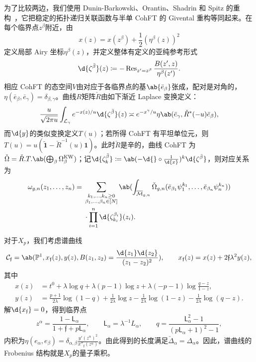 \documentclass{amsart}
\theoremstyle{definition}
\theoremstyle{remark}
\theoremstyle{plain}
\theoremstyle{definition}
\theoremstyle{remark}
\renewcommand{\P}{\mathbb{P}}
\newcommand{\Mbar}{\overline{\mathcal{M}}}
\newcommand{\mc}[1]{\mathcal{#1}}
\newcommand{\mf}[1]{\mathfrak{#1}}
\newcommand{\mr}[1]{\mathrm{#1}}
\newcommand{\on}[1]{\operatorname{#1}}
\newcommand{\ms}[1]{\mathsf{#1}}
\newcommand{\wt}[1]{\widetilde{#1}}
\newcommand{\1}{\mathbf{1}}
\newcommand{\2}{\mathbf{2}}
\newcommand{\3}{\mathbf{3}}
\begin{document}
为了比较两边，我们使用 Dunin-Barkowski、Orantin、Shadrin 和 Spitz 的重构~\cite{DOSS2014}，它把稳定的拓扑递归关联函数与半单 CohFT 的 Givental 重构等同起来。在每个临界点\(z^{\beta}\)附近，由
\[ x(z) = x(z^{\beta}) + \frac{1}{2}(\eta^{\beta}(z))^2 \]
定义局部 Airy 坐标\(\eta^{\beta}(z)\)，并定义整体有定义的亚纯参考形式
\[ \d{\zeta^{\bar{\beta}}}(z) \coloneqq -\on{Res}_{z'=z^{\beta}}\frac{B(z',z)}{\eta^{\beta}(z')}. \]
相应 CohFT 的态空间\(V\)由对应于各临界点的基\(\ab\{\bar{e}_{\beta}\}\)张成，配对是对角的，\(\eta(\bar{e}_{\beta},\bar{e}_{\gamma}) = \delta_{\beta,\gamma}\)。曲线\(R\)矩阵\(\check{R}\)由如下渐近 Laplace 变换定义：
\[ \frac{u}{\sqrt{2\pi u}}\int_{\mc{L}_{\gamma}} e^{-x(z)/u}\d{\zeta^{\bar{\beta}}}(z) \asymp e^{-x^{\gamma}/u}\eta\ab(\bar{e}_{\gamma}, \check{R}^*(-u)\bar{e}_{\beta}), \]
而\(\d{y}\)的类似变换定义\(T(u)\)；若所得 CohFT 有平坦单位元，则\(T(u) = u(\wt{\1}-\check{R}^{-1}(u)\1)\)。此时\(\check{R}\)是辛的，曲线 CohFT 为\(\check{\Omega} = \check{R}.T.\ab(\bigoplus_{\beta}\Omega^{\mr{KW}}_{\beta})\)；记\(\d{\zeta^{\bar{\beta}}_k} \coloneqq \ab(-\d{} \circ \frac{1}{\d{x}})^k \d{\zeta^{\bar{\beta}}}\)，则对应关系为
\begin{align*}
    \omega_{g,n}(z_1,\ldots,z_n) ={}& \sum_{\substack{k_1,\ldots,k_n \geq 0 \\ \beta_1,\ldots,\beta_n \in [N]}}\ab(\int_{\Mbar_{g,n}} \check{\Omega}_{g,n}(\bar{e}_{\beta_1}\psi_1^{k_1},\ldots,\bar{e}_{\beta_n}\psi_n^{k_n})) \\
    &\cdot \prod_{i=1}^n \d{\zeta^{\beta_i}_{k_i}}(z_i).
\end{align*}

对于\(X_p\)，我们考虑谱曲线
\[ \mc{C}_{\mf{f}} = \ab(\P^1, x_{\mf{f}}(z), y(z), B(z_1,z_2) = \frac{\d{z_1}\d{z_2}}{(z_1-z_2)^2}), \qquad x_{\mf{f}}(z) = x(z) + 2\mf{f}\lambda^2 y(z), \]
其中
\begin{align*}
    x(z) &= t^0 + \lambda \log q + \lambda(p-1)\log z + \lambda(-p-1)\log\frac{q-z}{1-z}, \\
    y(z) &= \frac{p+1}{2\lambda}\log(1-q) + \frac{1}{2\lambda}\log z - \frac{1}{2\lambda}\log(1-z) - \frac{1}{2\lambda}\log(q-z).
\end{align*}
解\(\d{x_{\mf{f}}} = 0\)，得到临界点
\[ z^{\alpha} = \frac{1-\ms{L}_{\alpha}}{1+\mf{f}+p\ms{L}_{\alpha}}, \qquad \ms{L}_{\alpha} = \lambda^{-1}L_{\alpha}, \qquad q = \frac{\ms{L}_{\alpha}^2-1}{(p\ms{L}_{\alpha}+1)^2-1}, \]
内积为\(\eta(e_{\alpha},e_{\beta}) = \delta_{\alpha,\beta}\frac{y'(z^{\alpha})^2}{x''_{\mf{f}}(z^{\alpha})}\)。由此得到的长度满足\(\check{\Delta}_{\alpha} = \Delta_{\alpha}\)。因此，谱曲线的 Frobenius 结构就是\(X_p\)的量子乘积。
\end{document}
